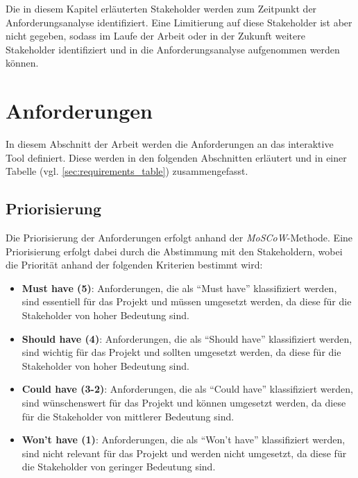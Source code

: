 Die in diesem Kapitel erläuterten Stakeholder werden zum Zeitpunkt der Anforderungsanalyse identifiziert. Eine Limitierung auf diese Stakeholder ist aber nicht gegeben, sodass im Laufe der Arbeit oder in der Zukunft weitere Stakeholder identifiziert und in die Anforderungsanalyse aufgenommen werden können.

\section{Anforderungen}
In diesem Abschnitt der Arbeit werden die Anforderungen an das interaktive Tool definiert. Diese werden in den folgenden Abschnitten erläutert und in einer Tabelle (vgl. \ref{sec:requirements_table}) zusammengefasst.

\subsection{Priorisierung}
Die Priorisierung der Anforderungen erfolgt anhand der \textit{MoSCoW}-Methode. Eine Priorisierung erfolgt dabei durch die Abstimmung mit den Stakeholdern, wobei die Priorität anhand der folgenden Kriterien bestimmt wird:

\begin{itemize}
    \item \textbf{Must have (5)}: Anforderungen, die als \enquote{Must have} klassifiziert werden, sind essentiell für das Projekt und müssen umgesetzt werden, da diese für die Stakeholder von hoher Bedeutung sind.
    \item \textbf{Should have (4)}: Anforderungen, die als \enquote{Should have} klassifiziert werden, sind wichtig für das Projekt und sollten umgesetzt werden, da diese für die Stakeholder von hoher Bedeutung sind.
    \item \textbf{Could have (3-2)}: Anforderungen, die als \enquote{Could have} klassifiziert werden, sind wünschenswert für das Projekt und können umgesetzt werden, da diese für die Stakeholder von mittlerer Bedeutung sind.
    \item \textbf{Won't have (1)}: Anforderungen, die als \enquote{Won't have} klassifiziert werden, sind nicht relevant für das Projekt und werden nicht umgesetzt, da diese für die Stakeholder von geringer Bedeutung sind.
\end{itemize}

